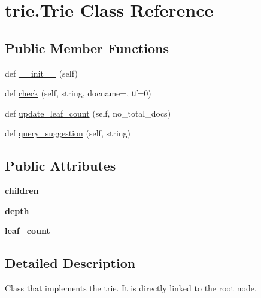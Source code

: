 \hypertarget{classtrie_1_1_trie}{}\section{trie.\+Trie Class Reference}
\label{classtrie_1_1_trie}
\subsection*{Public Member Functions}
\begin{DoxyCompactItemize}
\item 
def \hyperlink{classtrie_1_1_trie_a36d10ddf184aa8944b366278e3652a2f}{\+\_\+\+\_\+init\+\_\+\+\_\+} (self)
\item 
def \hyperlink{classtrie_1_1_trie_a270bb01a8e9b3ab3459758746dc4e434}{check} (self, string, docname=\textquotesingle{}\textquotesingle{}, tf=0)
\item 
def \hyperlink{classtrie_1_1_trie_ad9c6106b14049f789df88d70d4cf36c1}{update\+\_\+leaf\+\_\+count} (self, no\+\_\+total\+\_\+docs)
\item 
def \hyperlink{classtrie_1_1_trie_a66c2c3035ba7e37a9f9ada5f3c55591d}{query\+\_\+suggestion} (self, string)
\end{DoxyCompactItemize}
\subsection*{Public Attributes}
\begin{DoxyCompactItemize}
\item 
{\bfseries children}\hypertarget{classtrie_1_1_trie_a1ad4feb4d215545f082dfdb48e28e25c}{}\label{classtrie_1_1_trie_a1ad4feb4d215545f082dfdb48e28e25c}

\item 
{\bfseries depth}\hypertarget{classtrie_1_1_trie_ae7936c113992d223e60620e6a5bf15e7}{}\label{classtrie_1_1_trie_ae7936c113992d223e60620e6a5bf15e7}

\item 
{\bfseries leaf\+\_\+count}\hypertarget{classtrie_1_1_trie_ad2560d8eda3b7d63a0b379f26618279d}{}\label{classtrie_1_1_trie_ad2560d8eda3b7d63a0b379f26618279d}

\end{DoxyCompactItemize}


\subsection{Detailed Description}
\begin{DoxyVerb}Class that implements the trie. It is directly linked to the root node.\end{DoxyVerb}
 

